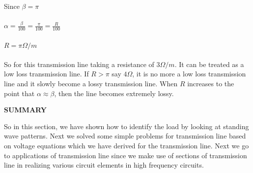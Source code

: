 Since ${\beta = \pi}$\\\\
${\alpha = \frac{\beta}{100} = \frac{\pi}{100} = \frac{R}{100}}$\\\\
${R = \pi\Omega/m}$\\\\ 
So for this transmission line taking a resistance of ${3\Omega /m}$. It can be treated as a low loss transmission line. If ${R>\pi}$ say ${4\Omega}$, it is no more a low loss transmission line and it slowly become a lossy transmission line. When ${R}$ increases to the point that ${\alpha\approx\beta}$, then the line becomes extremely lossy.\newpage

\begin{center}
\textbf{SUMMARY}
\end{center}
So in this section, we have shown how to identify the load by looking at standing wave patterns. Next we solved some simple problems for transmission line based on voltage equations which we have derived for the transmission line. Next we go to applications of transmission line since we make use of sections of transmission line in realizing various circuit elements in high frequency circuits.\\		
